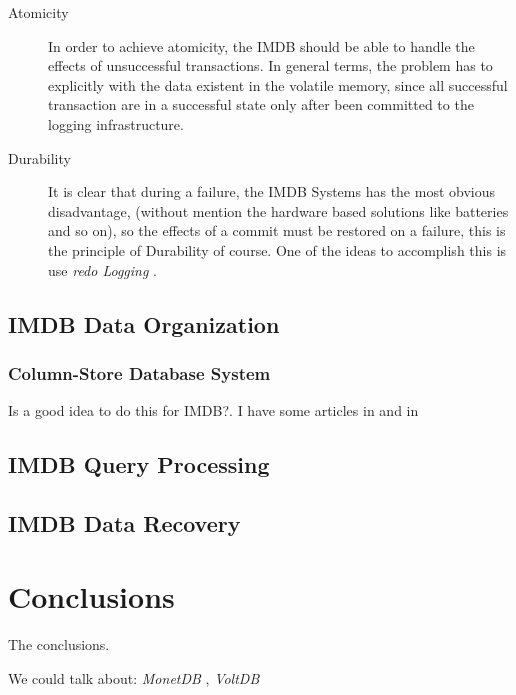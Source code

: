 \documentclass[10pt]{article} %
\begin{document}
\begin{description}
  \item[Atomicity] In order to achieve atomicity, the IMDB should be able to handle the effects of unsuccessful transactions. In general terms, the problem has to explicitly with the data existent in the volatile memory, since all successful transaction are in a successful state only after been committed to the logging infrastructure. %
  \item[Durability] It is clear that during a failure, the IMDB Systems has the most obvious disadvantage, (without mention the hardware based solutions like batteries and so on), so the effects of a commit must be restored on a failure, this is the principle of Durability of course. One of the ideas to accomplish this is use \emph{ redo Logging }. %
\end{description}

\subsection{IMDB Data Organization}
\subsubsection{Column-Store Database System}
Is a good idea to do this for IMDB?. I have some articles in \cite{ColumnOriented} and in \cite{ColumnOriented1}
\subsection{IMDB Query Processing}
\subsection{IMDB Data Recovery}


\section{Conclusions} 
The conclusions.

We could talk about: \emph{ MonetDB }, \emph{ VoltDB }





\end{document}
